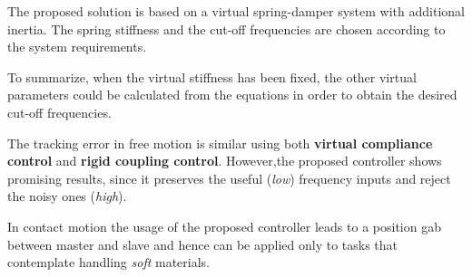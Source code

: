 The proposed solution is based on a virtual spring-damper system with additional
inertia. The spring stiffness and the cut-off frequencies are chosen according to the system requirements.
\bigskip

To summarize, when the virtual stiffness has been fixed, the other virtual
parameters could be calculated from the equations in order to obtain the desired
cut-off frequencies.
\bigskip

The tracking error in free motion is similar using both \textbf{virtual compliance control} and \textbf{rigid coupling control}. However,the proposed controller shows promising results, since it preserves the useful (\textsl{low}) frequency inputs and reject the noisy ones (\textsl{high}). 
\bigskip

In contact motion the usage of the proposed controller leads to a position gab between master and slave and hence can be applied only to tasks that contemplate handling \textsl{soft} materials.



